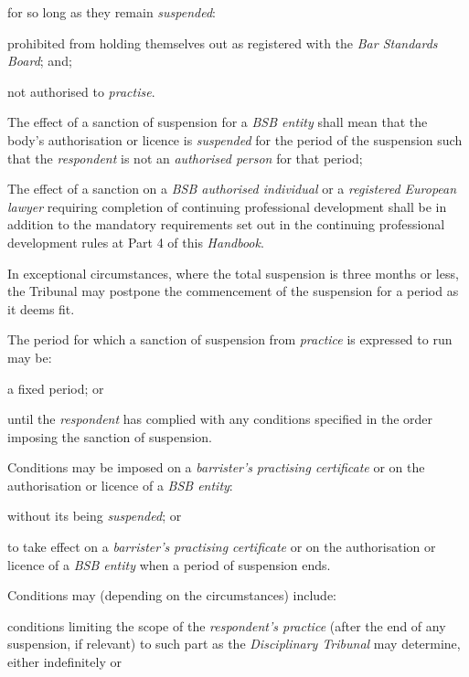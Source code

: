 for so long as they remain \emph{suspended}:\al
\item prohibited from holding themselves out as registered with
the \emph{Bar Standards Board}; and;\\
\item not authorised to \emph{practise}.\la \item The effect of a sanction of suspension for a \emph{BSB entity} shall mean that the body's authorisation or licence is \emph{suspended} for the period of the suspension such that the \emph{respondent} is not an \emph{authorised person }for that period;
\item The effect of a sanction on a \emph{BSB authorised individual} or
a \emph{registered European lawyer} requiring completion of continuing
professional development shall be in addition to the mandatory
requirements set out in the continuing professional development rules at
Part 4 of this \emph{Handbook}.\ln
{}\par
In exceptional circumstances, where the total suspension is three months
or less, the Tribunal may postpone the commencement of the suspension
for a period as it deems fit.\\
\par
The period for which a sanction of suspension from \emph{practice} is
expressed to run may be:\\\nl \item a fixed period; or\item until the \emph{respondent} has complied with any conditions
specified in the order imposing the sanction of suspension.\ln
{}\par
Conditions may be imposed on a\emph{ barrister's} \emph{practising
certificate} or on the authorisation or licence of a \emph{BSB
entity}:\\\nl \item without its being \emph{suspended}; or\item to take effect on a \emph{barrister's} \emph{practising
certificate} or on the authorisation or licence of a \emph{BSB
entity} when a period of suspension ends.\ln
{}\par
Conditions may (depending on the circumstances) include:\\\nl \item conditions limiting the scope of the \emph{respondent's
practice} (after the end of any suspension, if relevant) to such part as
the \emph{Disciplinary Tribunal} may determine, either indefinitely or
